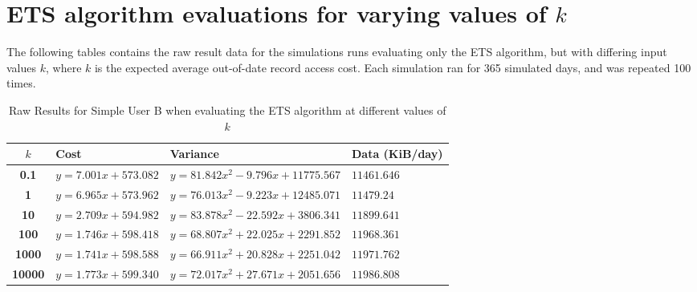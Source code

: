 
\section{ETS algorithm evaluations for varying values of $k$}

The following tables contains the raw result data for the simulations runs evaluating only the ETS algorithm, but with differing input values $k$, where $k$ is the expected average out-of-date record access cost.  Each simulation ran for 365 simulated days, and was repeated 100 times.

\begin{table}[htdp]
\begin{center}
\begin{tabular}{|c|l|l|l|}
\hline
\tiny\textbf{$k$} &  \tiny\textbf{Cost} & \tiny\textbf{Variance} & \tiny\textbf{Data (KiB/day)} \\
\hline
\tiny\textbf{0.1} & \tiny$y=7.001x+573.082$ & \tiny$y=81.842x^2-9.796x+11775.567 $ & \tiny$11461.646 $ \\
\hline
\tiny\textbf{1} & \tiny$y=6.965x+573.962$ & \tiny$y=76.013x^2-9.223x+12485.071 $ & \tiny$11479.24$ \\ 
\hline
\tiny\textbf{10} & \tiny$y=2.709x+594.982$ & \tiny$y=83.878x^2-22.592x+3806.341 $ & \tiny$11899.641 $ \\
\hline
\tiny\textbf{100} & \tiny$y=1.746x+598.418$ & \tiny$y=68.807x^2+22.025x+2291.852$ & \tiny$11968.361$ \\
\hline
\tiny\textbf{1000} & \tiny$y=1.741x+598.588$ & \tiny$y=66.911x^2+20.828x+2251.042 $ & \tiny$11971.762 $ \\
\hline
\tiny\textbf{10000} & \tiny$y=1.773x+599.340$ & \tiny$y=72.017x^2+27.671x+2051.656$ & \tiny$11986.808$ \\
\hline
\end{tabular}
\end{center}
\caption{Raw Results for Simple User B when evaluating the ETS algorithm at different values of $k$}
\label{simple_b:ets-k_rawresults}
\end{table}

